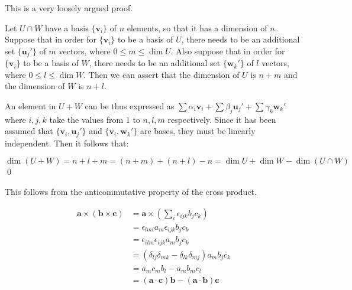 \documentclass[12pt]{article}
\begin{document}
This is a very loosely argued proof.

Let $U \cap W$ have a basis $\{\mathbf{v}_{i}\}$ of $n$ elements, so that it has a dimension of $n$. Suppose that in order for $\{\mathbf{v}_{i}\}$ to be a basis of $U$, there needs to be an additional set $\{\mathbf{u}_{j}'\}$ of $m$ vectors, where $0 \le m \le \dim{U}$. Also suppose that in order for $\{\mathbf{v}_{i}\}$ to be a basis of $W$, there needs to be an additional set $\{\mathbf{w}_{k}'\}$ of $l$ vectors, where $0 \le l \le \dim{W}$. Then we can assert that the dimension of $U$ is $n + m$ and the dimension of $W$ is $n + l$.

An element in $U + W$ can be thus expressed as $\sum \alpha_{i} \mathbf{v}_{i} + \sum \beta_{j} \mathbf{u}_{j}' + \sum \gamma_{k} \mathbf{w}_{k}'$ where $i, j, k$ take the values from $1$ to $n, l, m$ respectively. Since it has been assumed that $\{\mathbf{v}_{i}, \mathbf{u}_{j}'\}$ and $\{\mathbf{v}_{i}, \mathbf{w}_{k}'\}$ are bases, they must be linearly independent. Then it follows that:

\begin{equation}
    \dim{(U + W)} = n + l + m = (n + m) + (n + l) - n = \dim{U} + \dim{W} - \dim{(U \cap W)}
\end{equation}
\qed



This follows from the anticommutative property of the cross product.


\begin{equation}
    \begin{split}
        \mathbf{a} \times (\mathbf{b} \times \mathbf{c}) &= \mathbf{a} \times \left( \sum_{i} \epsilon_{ijk} b_{j} c_{k} \right) \\
        &= \epsilon_{lmi} a_{m} \epsilon_{ijk} b_{j} c_{k} \\
        &= \epsilon_{ilm} \epsilon_{ijk} a_{m} b_{j} c_{k} \\
        &= (\delta_{lj} \delta_{mk} - \delta_{lk} \delta_{mj}) a_{m} b_{j} c_{k} \\
        &= a_{m} c_{m} b_{l} - a_{m} b_{m} c_{l} \\
        &= (\mathbf{a} \cdot \mathbf{c})\mathbf{b} - (\mathbf{a} \cdot \mathbf{b})\mathbf{c}
    \end{split}
\end{equation}

\end{document}
